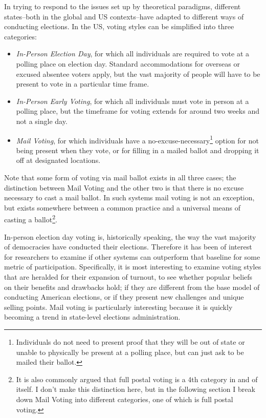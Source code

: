 \documentclass[12pt,twoside]{reedthesis}
\begin{document}
  In trying to respond to the issues set up by theoretical paradigms,
  different states--both in the global and US contexts--have adapted to
  different ways of conducting elections. In the US, voting styles can be
  simplified into three categories:
  
  \begin{itemize}
  \item
    \emph{In-Person Election Day}, for which all individuals are required
    to vote at a polling place on election day. Standard accommodations
    for overseas or excused absentee voters apply, but the vast majority
    of people will have to be present to vote in a particular time frame.
  \item
    \emph{In-Person Early Voting}, for which all individuals must vote in
    person at a polling place, but the timeframe for voting extends for
    around two weeks and not a single day.
  \item
    \emph{Mail Voting}, for which individuals have a
    no-excuse-necessary\footnote{Individuals do not need to present proof
      that they will be out of state or unable to physically be present at
      a polling place, but can just ask to be mailed their ballot.} option
    for not being present when they vote, or for filling in a mailed
    ballot and dropping it off at designated locations.
  \end{itemize}
  
  Note that some form of voting via mail ballot exists in all three cases;
  the distinction between Mail Voting and the other two is that there is
  no excuse necessary to cast a mail ballot. In such systems mail voting
  is not an exception, but exists somewhere between a common practice and
  a universal means of casting a ballot\footnote{It is also commonly
    argued that full postal voting is a 4th category in and of itself. I
    don't make this distinction here, but in the following section I break
    down Mail Voting into different categories, one of which is full
    postal voting.}.
  
  In-person election day voting is, historically speaking, the way the
  vast majority of democracies have conducted their elections. Therefore
  it has been of interest for researchers to examine if other systems can
  outperform that baseline for some metric of participation. Specifically,
  it is most interesting to examine voting styles that are heralded for
  their expansion of turnout, to see whether popular beliefs on their
  benefits and drawbacks hold; if they are different from the base model
  of conducting American elections, or if they present new challenges and
  unique selling points. Mail voting is particularly interesting because
  it is quickly becoming a trend in state-level elections administration.
  
\end{document}
